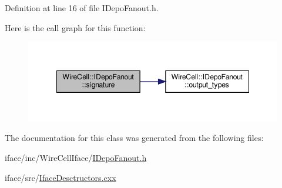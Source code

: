 Definition at line 16 of file I\+Depo\+Fanout.\+h.

Here is the call graph for this function\+:
\nopagebreak
\begin{figure}[H]
\begin{center}
\leavevmode
\includegraphics[width=348pt]{class_wire_cell_1_1_i_depo_fanout_a1c41ee7c457b895198b509027686bd53_cgraph}
\end{center}
\end{figure}


The documentation for this class was generated from the following files\+:\begin{DoxyCompactItemize}
\item 
iface/inc/\+Wire\+Cell\+Iface/\hyperlink{_i_depo_fanout_8h}{I\+Depo\+Fanout.\+h}\item 
iface/src/\hyperlink{_iface_desctructors_8cxx}{Iface\+Desctructors.\+cxx}\end{DoxyCompactItemize}
